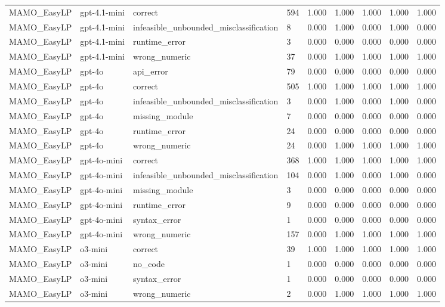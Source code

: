 \begin{table}[t]
\begin{tabular}{lllllllll}
MAMO\_EasyLP & gpt-4.1-mini & correct & 594 & 1.000 & 1.000 & 1.000 & 1.000 & 1.000 \\
MAMO\_EasyLP & gpt-4.1-mini & infeasible\_unbounded\_misclassification & 8 & 0.000 & 1.000 & 0.000 & 1.000 & 0.000 \\
MAMO\_EasyLP & gpt-4.1-mini & runtime\_error & 3 & 0.000 & 0.000 & 0.000 & 0.000 & 0.000 \\
MAMO\_EasyLP & gpt-4.1-mini & wrong\_numeric & 37 & 0.000 & 1.000 & 1.000 & 1.000 & 1.000 \\
MAMO\_EasyLP & gpt-4o & api\_error & 79 & 0.000 & 0.000 & 0.000 & 0.000 & 0.000 \\
MAMO\_EasyLP & gpt-4o & correct & 505 & 1.000 & 1.000 & 1.000 & 1.000 & 1.000 \\
MAMO\_EasyLP & gpt-4o & infeasible\_unbounded\_misclassification & 3 & 0.000 & 1.000 & 0.000 & 1.000 & 0.000 \\
MAMO\_EasyLP & gpt-4o & missing\_module & 7 & 0.000 & 0.000 & 0.000 & 0.000 & 0.000 \\
MAMO\_EasyLP & gpt-4o & runtime\_error & 24 & 0.000 & 0.000 & 0.000 & 0.000 & 0.000 \\
MAMO\_EasyLP & gpt-4o & wrong\_numeric & 24 & 0.000 & 1.000 & 1.000 & 1.000 & 1.000 \\
MAMO\_EasyLP & gpt-4o-mini & correct & 368 & 1.000 & 1.000 & 1.000 & 1.000 & 1.000 \\
MAMO\_EasyLP & gpt-4o-mini & infeasible\_unbounded\_misclassification & 104 & 0.000 & 1.000 & 0.000 & 1.000 & 0.000 \\
MAMO\_EasyLP & gpt-4o-mini & missing\_module & 3 & 0.000 & 0.000 & 0.000 & 0.000 & 0.000 \\
MAMO\_EasyLP & gpt-4o-mini & runtime\_error & 9 & 0.000 & 0.000 & 0.000 & 0.000 & 0.000 \\
MAMO\_EasyLP & gpt-4o-mini & syntax\_error & 1 & 0.000 & 0.000 & 0.000 & 0.000 & 0.000 \\
MAMO\_EasyLP & gpt-4o-mini & wrong\_numeric & 157 & 0.000 & 1.000 & 1.000 & 1.000 & 1.000 \\
MAMO\_EasyLP & o3-mini & correct & 39 & 1.000 & 1.000 & 1.000 & 1.000 & 1.000 \\
MAMO\_EasyLP & o3-mini & no\_code & 1 & 0.000 & 0.000 & 0.000 & 0.000 & 0.000 \\
MAMO\_EasyLP & o3-mini & syntax\_error & 1 & 0.000 & 0.000 & 0.000 & 0.000 & 0.000 \\
MAMO\_EasyLP & o3-mini & wrong\_numeric & 2 & 0.000 & 1.000 & 1.000 & 1.000 & 1.000 \\

\end{tabular}
\end{table}
